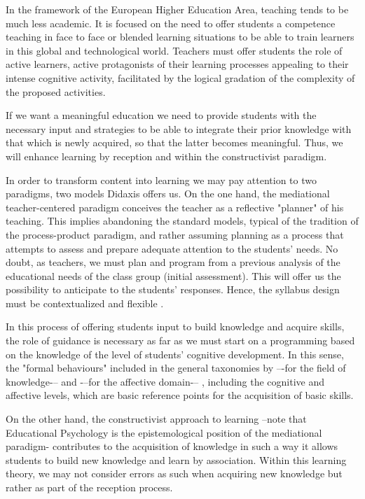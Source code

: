 \documentclass[english]{textolivre}
\begin{document}
In the framework of the European Higher Education Area, teaching tends to be much less academic. It is focused on the need to offer students a competence teaching in face to face or blended learning situations to be able to train learners in this global and technological world. Teachers must offer students the role of active learners, active protagonists of their learning processes appealing to their intense cognitive activity, facilitated by the logical gradation of the complexity of the proposed activities.

If we want a meaningful education we need to provide students with the necessary input and strategies to be able to integrate their prior knowledge with that which is newly acquired, so that the latter becomes meaningful. Thus, we will enhance learning by reception and within the constructivist paradigm.

In order to transform content into learning we may pay attention to two paradigms, two models Didaxis offers us. On the one hand, the mediational teacher-centered paradigm conceives the teacher as a reflective "planner" of his teaching. This implies abandoning the standard models, typical of the tradition of the process-product paradigm, and rather assuming planning as a process that attempts to assess and prepare adequate attention to the students’ needs. No doubt, as teachers, we must plan and program from a previous analysis of the educational needs of the class group (initial assessment). This will offer us the possibility to anticipate to the students’ responses. Hence, the syllabus design must be contextualized and flexible \cite{soler2013}.

In this process of offering students input to build knowledge and acquire skills, the role of guidance is necessary as far as we must start on a programming based on the knowledge of the level of students’ cognitive development. In this sense, the "formal behaviours" included in the general taxonomies by \textcite{bloom1972} –-for the field of knowledge-– and \textcite{krathwohl1973} -–for the affective domain-– , including the cognitive and affective levels, which are basic reference points for the acquisition of basic skills.

On the other hand, the constructivist approach to learning –note that Educational Psychology is the epistemological position of the mediational paradigm- contributes to the acquisition of knowledge in such a way it allows students to build new knowledge and learn by association. Within this learning theory, we may not consider errors as such when acquiring new knowledge but rather as part of the reception process.
\end{document}
